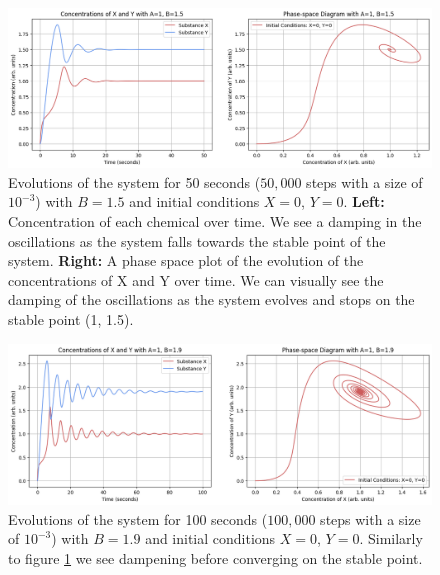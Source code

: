 \documentclass[reprint, amsmath, amssymb, aps]{revtex4-2}
\begin{document}
\begin{figure}
\includegraphics[width=1.65\columnwidth]{combinedPlot_fallToStable.png}
\caption{\label{fig:oneToOne-Five}Evolutions of the system for 50 seconds ($50,000$ steps with a size of $10^{-3}$) with $B=1.5$ and initial conditions $X=0$, $Y=0$. \textbf{Left:} Concentration of each chemical over time. We see a damping in the oscillations as the system falls towards the stable point of the system. \textbf{Right:} A phase space plot of the evolution of the concentrations of X and Y over time. We can visually see the damping of the oscillations as the system evolves and stops on the stable point (1, 1.5).}
\end{figure}

\begin{figure}
\includegraphics[width=1.65\columnwidth]{oneToOne-Nine.png}
\caption{\label{fig:oneToOne-Nine}Evolutions of the system for 100 seconds ($100,000$ steps with a size of $10^{-3}$) with $B=1.9$ and initial conditions $X=0$, $Y=0$. Similarly to figure \ref{fig:oneToOne-Five} we see dampening before converging on the stable point.}
\end{figure}
\end{document}
